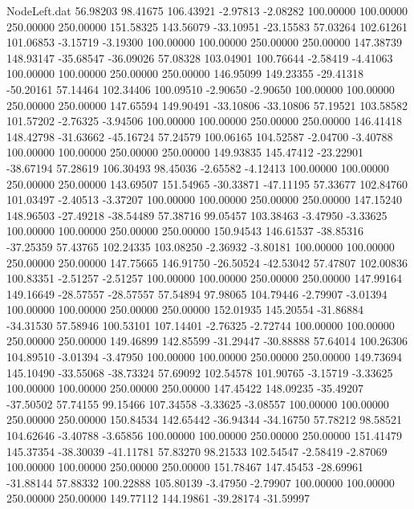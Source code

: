 \begin{filecontents}{NodeLeft.dat}
  56.98203   98.41675  106.43921    -2.97813   -2.08282  100.00000  100.00000  250.00000  250.00000  151.58325  143.56079  -33.10951  -23.15583
  57.03264  102.61261  101.06853    -3.15719   -3.19300  100.00000  100.00000  250.00000  250.00000  147.38739  148.93147  -35.68547  -36.09026
  57.08328  103.04901  100.76644    -2.58419   -4.41063  100.00000  100.00000  250.00000  250.00000  146.95099  149.23355  -29.41318  -50.20161
  57.14464  102.34406  100.09510    -2.90650   -2.90650  100.00000  100.00000  250.00000  250.00000  147.65594  149.90491  -33.10806  -33.10806
  57.19521  103.58582  101.57202    -2.76325   -3.94506  100.00000  100.00000  250.00000  250.00000  146.41418  148.42798  -31.63662  -45.16724
  57.24579  100.06165  104.52587    -2.04700   -3.40788  100.00000  100.00000  250.00000  250.00000  149.93835  145.47412  -23.22901  -38.67194
  57.28619  106.30493   98.45036    -2.65582   -4.12413  100.00000  100.00000  250.00000  250.00000  143.69507  151.54965  -30.33871  -47.11195
  57.33677  102.84760  101.03497    -2.40513   -3.37207  100.00000  100.00000  250.00000  250.00000  147.15240  148.96503  -27.49218  -38.54489
  57.38716   99.05457  103.38463    -3.47950   -3.33625  100.00000  100.00000  250.00000  250.00000  150.94543  146.61537  -38.85316  -37.25359
  57.43765  102.24335  103.08250    -2.36932   -3.80181  100.00000  100.00000  250.00000  250.00000  147.75665  146.91750  -26.50524  -42.53042
  57.47807  102.00836  100.83351    -2.51257   -2.51257  100.00000  100.00000  250.00000  250.00000  147.99164  149.16649  -28.57557  -28.57557
  57.54894   97.98065  104.79446    -2.79907   -3.01394  100.00000  100.00000  250.00000  250.00000  152.01935  145.20554  -31.86884  -34.31530
  57.58946  100.53101  107.14401    -2.76325   -2.72744  100.00000  100.00000  250.00000  250.00000  149.46899  142.85599  -31.29447  -30.88888
  57.64014  100.26306  104.89510    -3.01394   -3.47950  100.00000  100.00000  250.00000  250.00000  149.73694  145.10490  -33.55068  -38.73324
  57.69092  102.54578  101.90765    -3.15719   -3.33625  100.00000  100.00000  250.00000  250.00000  147.45422  148.09235  -35.49207  -37.50502
  57.74155   99.15466  107.34558    -3.33625   -3.08557  100.00000  100.00000  250.00000  250.00000  150.84534  142.65442  -36.94344  -34.16750
  57.78212   98.58521  104.62646    -3.40788   -3.65856  100.00000  100.00000  250.00000  250.00000  151.41479  145.37354  -38.30039  -41.11781
  57.83270   98.21533  102.54547    -2.58419   -2.87069  100.00000  100.00000  250.00000  250.00000  151.78467  147.45453  -28.69961  -31.88144
  57.88332  100.22888  105.80139    -3.47950   -2.79907  100.00000  100.00000  250.00000  250.00000  149.77112  144.19861  -39.28174  -31.59997

\end{filecontents}
